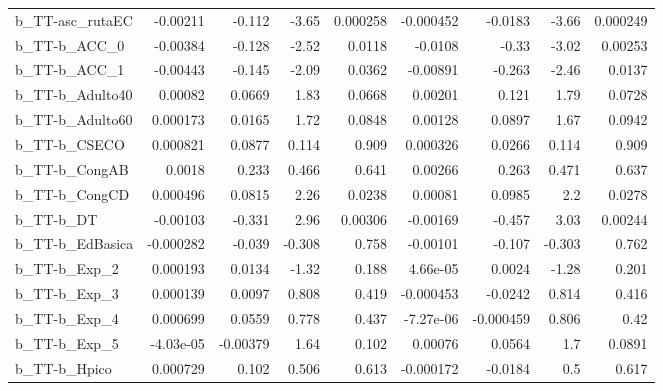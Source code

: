 \begin{tabular}{lrrrrrrrr}
b\_TT-asc\_rutaEC            &    -0.00211 &       -0.112 &    -3.65 & 0.000258 &  -0.000452 &     -0.0183 &        -3.66 &      0.000249 \\
b\_TT-b\_ACC\_0               &    -0.00384 &       -0.128 &    -2.52 &   0.0118 &    -0.0108 &       -0.33 &        -3.02 &       0.00253 \\
b\_TT-b\_ACC\_1               &    -0.00443 &       -0.145 &    -2.09 &   0.0362 &   -0.00891 &      -0.263 &        -2.46 &        0.0137 \\
b\_TT-b\_Adulto40            &     0.00082 &       0.0669 &     1.83 &   0.0668 &    0.00201 &       0.121 &         1.79 &        0.0728 \\
b\_TT-b\_Adulto60            &    0.000173 &       0.0165 &     1.72 &   0.0848 &    0.00128 &      0.0897 &         1.67 &        0.0942 \\
b\_TT-b\_CSECO               &    0.000821 &       0.0877 &    0.114 &    0.909 &   0.000326 &      0.0266 &        0.114 &         0.909 \\
b\_TT-b\_CongAB              &      0.0018 &        0.233 &    0.466 &    0.641 &    0.00266 &       0.263 &        0.471 &         0.637 \\
b\_TT-b\_CongCD              &    0.000496 &       0.0815 &     2.26 &   0.0238 &    0.00081 &      0.0985 &          2.2 &        0.0278 \\
b\_TT-b\_DT                  &    -0.00103 &       -0.331 &     2.96 &  0.00306 &   -0.00169 &      -0.457 &         3.03 &       0.00244 \\
b\_TT-b\_EdBasica            &   -0.000282 &       -0.039 &   -0.308 &    0.758 &   -0.00101 &      -0.107 &       -0.303 &         0.762 \\
b\_TT-b\_Exp\_2               &    0.000193 &       0.0134 &    -1.32 &    0.188 &   4.66e-05 &      0.0024 &        -1.28 &         0.201 \\
b\_TT-b\_Exp\_3               &    0.000139 &       0.0097 &    0.808 &    0.419 &  -0.000453 &     -0.0242 &        0.814 &         0.416 \\
b\_TT-b\_Exp\_4               &    0.000699 &       0.0559 &    0.778 &    0.437 &  -7.27e-06 &   -0.000459 &        0.806 &          0.42 \\
b\_TT-b\_Exp\_5               &   -4.03e-05 &     -0.00379 &     1.64 &    0.102 &    0.00076 &      0.0564 &          1.7 &        0.0891 \\
b\_TT-b\_Hpico               &    0.000729 &        0.102 &    0.506 &    0.613 &  -0.000172 &     -0.0184 &          0.5 &         0.617 \\

\end{tabular}
